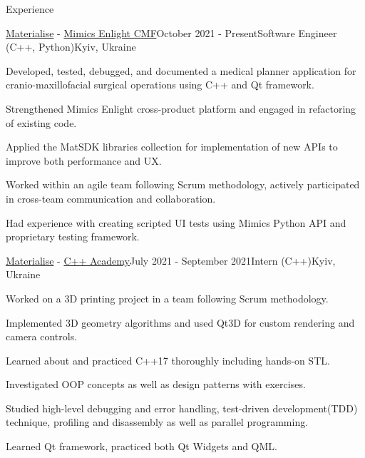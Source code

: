 \documentclass[
	11pt, %
]{resume} %
\begin{document}

\begin{rSection}{Experience}

	\begin{rSubsection}{\href{https://www.materialise.com/en}{\color{blue}Materialise} - \href{https://www.materialise.com/ja/healthcare/mimics-enlight-cmf}{\color{blue}Mimics Enlight CMF}}{October 2021 - Present}{Software Engineer (C++, Python)}{Kyiv, Ukraine}
        \item Developed, tested, debugged, and documented a medical planner application for cranio-maxillofacial surgical operations using C++ and Qt framework.
        \item Strengthened Mimics Enlight cross-product platform and engaged in refactoring of existing code.
		\item Applied the MatSDK libraries collection for implementation of new APIs to improve both performance and UX.
        \item Worked within an agile team following Scrum methodology, actively participated in cross-team communication and collaboration.
        \item Had experience with creating scripted UI tests using Mimics Python API and proprietary testing framework.
	\end{rSubsection}


    \begin{rSubsection}{\href{https://www.materialise.com/en}{\color{blue}Materialise} - \href{https://www.materialise.com/en/careers/students-graduates/internships}{\color{blue}C++ Academy}}{July 2021 - September 2021}{Intern (C++)}{Kyiv, Ukraine}
        \item Worked on a 3D printing project in a team following Scrum methodology.
        \item Implemented 3D geometry algorithms and used Qt3D for custom rendering and camera controls.
        \item Learned about and practiced C++17 thoroughly including hands-on STL.
        \item Investigated OOP concepts as well as design patterns with exercises.
        \item Studied high-level debugging and error handling, test-driven development(TDD) technique, profiling and disassembly as well as parallel programming.
        \item Learned Qt framework, practiced both Qt Widgets and QML.
    \end{rSubsection}

\end{rSection}
\end{document}
